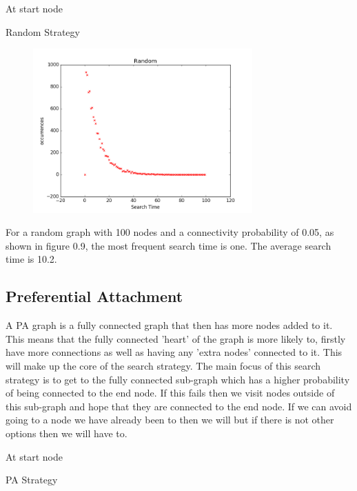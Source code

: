 \documentclass[paper=a4, fontsize=11pt]{scrartcl}
\numberwithin{equation}{section}		%
\numberwithin{figure}{section}			%
\numberwithin{table}{section}				%
\begin{document}
\begin{algorithm}[H]
 At start node\;
 \caption{Random Strategy}
\end{algorithm}

\begin{figure}[h]
\center
\caption{}
\includegraphics[width=0.75\textwidth]{pictures/randomSearch.png}
\end{figure}

For a random graph with 100 nodes and a connectivity probability of 0.05, as shown in figure 0.9, the most frequent search time is one. The average search time is 10.2. 

\subsection*{Preferential Attachment}

A PA graph is a fully connected graph that then has more nodes added to it. This means that the fully connected 'heart' of the graph is more likely to, firstly have more connections as well as having any 'extra nodes' connected to it. This will make up the core of the search strategy. The main focus of this search strategy is to get to the fully connected sub-graph which has a higher probability of being connected to the end node. If this fails then we visit nodes outside of this sub-graph and hope that they are connected to the end node. If we can avoid going to a node we have already been to then we will but if there is not other options then we will have to.\\

\begin{algorithm}[H]
 At start node\;
 \caption{PA Strategy}
\end{algorithm}
\end{document}
